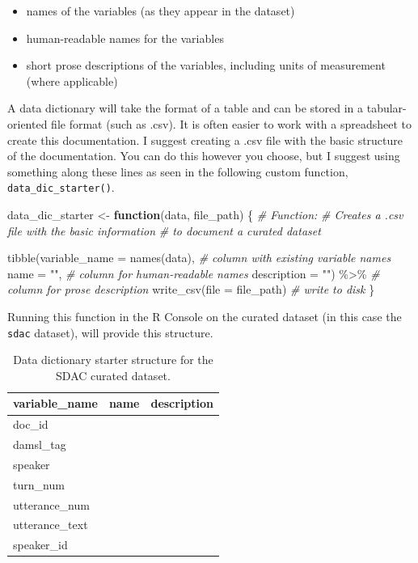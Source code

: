 \documentclass[
]{article}
\newenvironment{Shaded}{\begin{snugshade}}{\end{snugshade}}
\newcommand{\AttributeTok}[1]{\textcolor[rgb]{0.77,0.63,0.00}{#1}}
\newcommand{\CommentTok}[1]{\textcolor[rgb]{0.56,0.35,0.01}{\textit{#1}}}
\newcommand{\ControlFlowTok}[1]{\textcolor[rgb]{0.13,0.29,0.53}{\textbf{#1}}}
\newcommand{\FunctionTok}[1]{\textcolor[rgb]{0.00,0.00,0.00}{#1}}
\newcommand{\NormalTok}[1]{#1}
\newcommand{\OtherTok}[1]{\textcolor[rgb]{0.56,0.35,0.01}{#1}}
\newcommand{\SpecialCharTok}[1]{\textcolor[rgb]{0.00,0.00,0.00}{#1}}
\newcommand{\StringTok}[1]{\textcolor[rgb]{0.31,0.60,0.02}{#1}}
\providecommand{\tightlist}{%
  \setlength{\itemsep}{0pt}\setlength{\parskip}{0pt}}
\begin{document}
\begin{itemize}
\tightlist
\item
  names of the variables (as they appear in the dataset)
\item
  human-readable names for the variables
\item
  short prose descriptions of the variables, including units of measurement (where applicable)
\end{itemize}

A data dictionary will take the format of a table and can be stored in a tabular-oriented file format (such as .csv). It is often easier to work with a spreadsheet to create this documentation. I suggest creating a .csv file with the basic structure of the documentation. You can do this however you choose, but I suggest using something along these lines as seen in the following custom function, \texttt{data\_dic\_starter()}.

\begin{Shaded}
\begin{Highlighting}[]
\NormalTok{data\_dic\_starter }\OtherTok{\textless{}{-}} \ControlFlowTok{function}\NormalTok{(data, file\_path) \{}
  \CommentTok{\# Function:}
  \CommentTok{\# Creates a .csv file with the basic information}
  \CommentTok{\# to document a curated dataset}
  
  \FunctionTok{tibble}\NormalTok{(}\AttributeTok{variable\_name =} \FunctionTok{names}\NormalTok{(data), }\CommentTok{\# column with existing variable names }
       \AttributeTok{name =} \StringTok{""}\NormalTok{, }\CommentTok{\# column for human{-}readable names}
       \AttributeTok{description =} \StringTok{""}\NormalTok{) }\SpecialCharTok{\%\textgreater{}\%} \CommentTok{\# column for prose description}
  \FunctionTok{write\_csv}\NormalTok{(}\AttributeTok{file =}\NormalTok{ file\_path) }\CommentTok{\# write to disk}
\NormalTok{\}}
\end{Highlighting}
\end{Shaded}

Running this function in the R Console on the curated dataset (in this case the \texttt{sdac} dataset), will provide this structure.

\begin{table}

\caption{\label{tab:cd-documentation-dic-starter-structure}Data dictionary starter structure for the SDAC curated dataset.}
\centering
\begin{tabular}[t]{lll}
\toprule
variable\_name & name & description\\
\midrule
doc\_id &  & \\
damsl\_tag &  & \\
speaker &  & \\
turn\_num &  & \\
utterance\_num &  & \\
\addlinespace
utterance\_text &  & \\
speaker\_id &  & \\
\bottomrule
\end{tabular}
\end{table}
\end{document}
